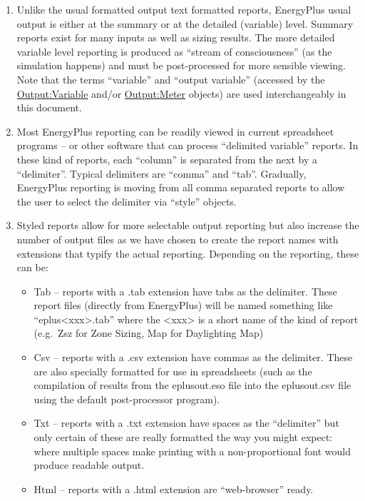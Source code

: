 \begin{enumerate}
  \item
    Unlike the usual formatted output text formatted reports, EnergyPlus usual output is either at the summary or at the detailed (variable) level. Summary reports exist for many inputs as well as sizing results. The more detailed variable level reporting is produced as ``stream of consciousness'' (as the simulation happens) and must be post-processed for more sensible viewing. Note that the terms ``variable'' and ``output variable'' (accessed by the \hyperref[outputvariable]{Output:Variable} and/or \hyperref[outputmeter-and-outputmetermeterfileonly]{Output:Meter} objects) are used interchangeably in this document.
  \item
    Most EnergyPlus reporting can be readily viewed in current spreadsheet programs -- or other software that can process ``delimited variable'' reports. In these kind of reports, each ``column'' is separated from the next by a ``delimiter''. Typical delimiters are ``comma'' and ``tab''. Gradually, EnergyPlus reporting is moving from all comma separated reports to allow the user to select the delimiter via ``style'' objects.
  \item
    Styled reports allow for more selectable output reporting but also increase the number of output files as we have chosen to create the report names with extensions that typify the actual reporting. Depending on the reporting, these can be:
    \begin{itemize}
      \item
        Tab -- reports with a .tab extension have tabs as the delimiter. These report files (directly from EnergyPlus) will be named something like ``eplus\textless{}xxx\textgreater{}.tab'' where the \textless{}xxx\textgreater{} is a short name of the kind of report (e.g.~Zsz for Zone Sizing, Map for Daylighting Map)
      \item
        Csv -- reports with a .csv extension have commas as the delimiter. These are also specially formatted for use in spreadsheets (such as the compilation of results from the eplusout.eso file into the eplusout.csv file using the default post-processor program).
      \item
        Txt -- reports with a .txt extension have spaces as the ``delimiter'' but only certain of these are really formatted the way you might expect: where multiple spaces make printing with a non-proportional font would produce readable output.
      \item
        Html -- reports with a .html extension are ``web-browser'' ready.
    \end{itemize}
\end{enumerate}